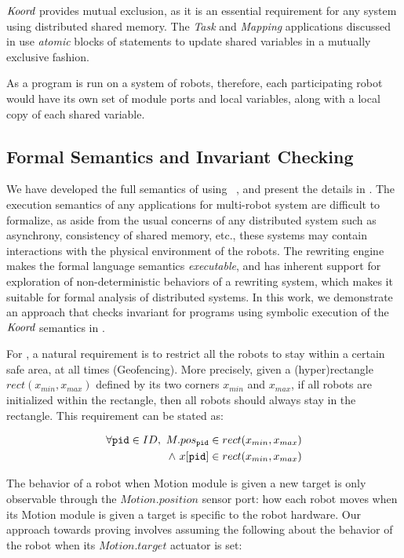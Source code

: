$\emph{Koord}$ provides mutual exclusion, as it is an essential requirement for any system using distributed shared memory. The \emph{Task} and \emph{Mapping} applications discussed in  use \emph{atomic} blocks of statements to update shared variables in a mutually exclusive fashion.



As a \lgname program is run on a system of robots,
therefore, each participating robot would have its own set of module ports and local variables, along with a local copy of each  shared variable.

\subsection{Formal Semantics and Invariant Checking}

We have developed the full semantics of \lgname using \K~\cite{rosu-serbanuta-2013-k}, and present the details in . The execution semantics of any applications for multi-robot system are difficult to formalize, as aside from the usual concerns of any distributed system such as asynchrony, consistency of shared memory, etc., these systems may contain interactions with the physical environment of the robots.
The \K rewriting engine makes the formal language semantics \emph{executable}, and has inherent support for exploration of non-deterministic behaviors of a rewriting system, which makes it suitable for formal analysis of distributed systems.
In this work, we demonstrate an approach that checks invariant for \lgname programs using symbolic execution of the $\emph{Koord}$ semantics in \K.

For \LineForm, a natural requirement is to restrict all the robots to stay within a certain safe area, at all times (Geofencing).
More precisely, given a (hyper)rectangle $rect(x_{min}, x_{max})$ defined by its two corners $x_{min}$ and $x_{max}$,
if all robots are initialized within the rectangle, then all robots should always stay in the rectangle. This requirement can be stated as:
\begin{invariant}\label{inv:lineform}
\[
\begin{split}
    \forall \texttt{pid} \in ID,\ M.pos_{\texttt{pid}} \in rect(x_{min}, x_{max}) \\
    \land\ x[\texttt{pid}] \in rect(x_{min}, x_{max})
\end{split}
\]
\end{invariant}
The behavior of a robot when Motion module is given a new target is only observable through the $Motion.position$ sensor port: how each robot moves when its Motion module is given a target is specific to the robot hardware. Our approach towards proving  involves assuming the following about the behavior of the robot when its $Motion.target$ actuator is set:

